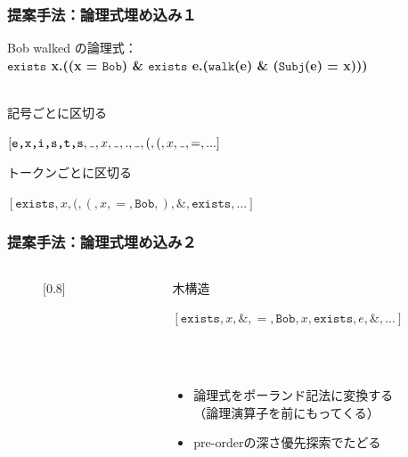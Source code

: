 \documentclass[dvipdfmx]{beamer}
\newcommand{\LF}[1]{\ensuremath{\texttt{#1}}}
\newcommand\vartextvisiblespace[1][.5em]{%
  \makebox[#1]{%
    \kern.07em
    \vrule height.3ex
    \hrulefill
    \vrule height.3ex
    \kern.07em
  }%
}
\begin{document}
\begin{frame}
\frametitle{提案手法：論理式埋め込み１}
Bob walked の論理式：\\
\textbf{
  \LF{exists} x.((x = \LF{Bob}) \& \LF{exists} e.(\LF{walk}(e) \& (\LF{Subj}(e) = x)))
}
\\~\
\begin{block}{記号ごとに区切る}
\begin{center}
$[\LF{e,x,i,s,t,s}, {\tt \vartextvisiblespace}, x,{\tt \vartextvisiblespace},.,{\tt \vartextvisiblespace},(,(,x,{\tt \vartextvisiblespace},=,...]$
\end{center}
\end{block}
\begin{block}{トークンごとに区切る}
\begin{center}
  $[\LF{exists},x,(,(,x,=,\LF{Bob},),\&,\LF{exists},...]$
\end{center}
\end{block}
\end{frame}


\begin{frame}
\frametitle{提案手法：論理式埋め込み２}
\begin{columns}[t]
    \begin{column}{0.4\textwidth} %
        \begin{figure}[h]
        \begin{center}
          \scalebox{}[0.8]{
          }
        \end{center}
        \end{figure}
    \end{column}
    \begin{column}{0.6\textwidth} %
      \begin{block}{木構造}
        \begin{center}
          $[\LF{exists},x,\&,=,\LF{Bob},x,\LF{exists},e,\&,...]$
        \end{center}
      \end{block}
      \\~\
      \begin{itemize}
        \item 論理式をポーランド記法に変換する\\（論理演算子を前にもってくる）
        \item pre-orderの深さ優先探索でたどる
      \end{itemize}
    \end{column}
\end{columns}

\end{frame}
\end{document}
